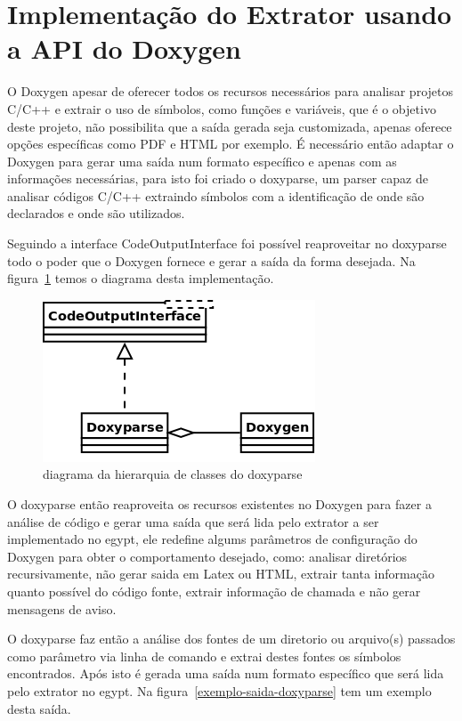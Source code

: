 \section{Implementação do Extrator usando a API do Doxygen}

O Doxygen apesar de oferecer todos os recursos necessários para
analisar projetos C/C++ e extrair o uso de símbolos, como funções e variáveis,
que é o objetivo deste projeto, não possibilita que a saída gerada seja
customizada, apenas oferece opções específicas como PDF e HTML por exemplo. É
necessário então adaptar o Doxygen para gerar uma saída num formato
específico e apenas com as informações necessárias, para isto foi criado o
doxyparse, um parser capaz de analisar códigos C/C++ extraindo símbolos
com a identificação de onde são declarados e onde são utilizados.

Seguindo a interface CodeOutputInterface foi possível reaproveitar no doxyparse
todo o poder que o Doxygen fornece e gerar a saída da forma desejada. Na
figura~\ref{doxyparse-diagram} temos o diagrama desta implementação.

\begin{figure}[h]
\center
\includegraphics[scale=0.4]{imagens/doxyparse-diagram}
\caption{diagrama da hierarquia de classes do doxyparse}
\label{doxyparse-diagram}
\end{figure}

O doxyparse então reaproveita os recursos existentes no Doxygen para fazer a
análise de código e gerar uma saída que será lida pelo extrator a ser
implementado no egypt, ele redefine algums parâmetros de configuração
do Doxygen para obter o comportamento desejado, como: analisar diretórios
recursivamente, não gerar saida em Latex ou HTML, extrair tanta informação
quanto possível do código fonte, extrair informação de chamada e não gerar
mensagens de aviso.

O doxyparse faz então a análise dos fontes de um diretorio ou arquivo(s)
passados como parâmetro via linha de comando e extrai destes fontes os símbolos
encontrados. Após isto é gerada uma saída num formato específico que será lida
pelo extrator no egypt. Na figura~\ref{exemplo-saida-doxyparse} tem um exemplo
desta saída.

